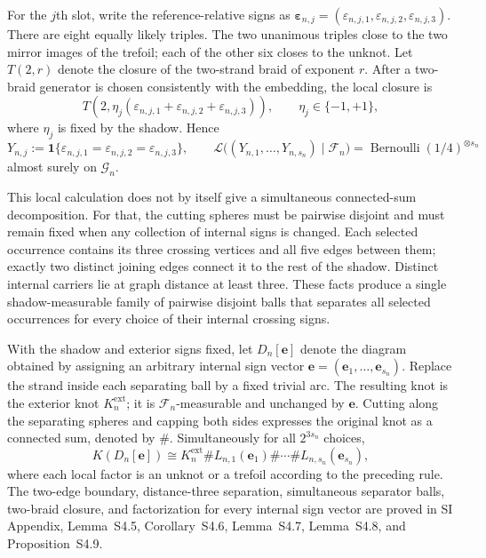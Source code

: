 \documentclass[9pt,twoside]{pnas-new}
\theoremstyle{definition}
\theoremstyle{remark}
\newcommand{\SILocation}[1]{SI Appendix, #1}
\newcommand{\SIGenuineInterface}{Lemma~S4.5}
\newcommand{\SIDistanceThreeBuffer}{Corollary~S4.6}
\newcommand{\SISimultaneousSeparators}{Lemma~S4.7}
\newcommand{\SITwoBraidClosure}{Lemma~S4.8}
\newcommand{\SIPersistentFactorization}{Proposition~S4.9}
\begin{document}
For the $j$th slot, write the reference-relative signs as $\boldsymbol\varepsilon_{n,j}=(\varepsilon_{n,j,1},\varepsilon_{n,j,2},\varepsilon_{n,j,3})$.  There are eight equally likely triples.  The two unanimous triples close to the two mirror images of the trefoil; each of the other six closes to the unknot.  Let $T(2,r)$ denote the closure of the two-strand braid of exponent $r$.  After a two-braid generator is chosen consistently with the embedding, the local closure is
\[
 T\!\left(2,\eta_j(\varepsilon_{n,j,1}+\varepsilon_{n,j,2}+\varepsilon_{n,j,3})\right),
 \qquad \eta_j\in\{-1,+1\},
\]
where $\eta_j$ is fixed by the shadow.  Hence
\[
 Y_{n,j}:=\mathbf 1\{\varepsilon_{n,j,1}=\varepsilon_{n,j,2}=\varepsilon_{n,j,3}\},
 \qquad
 \mathcal L\bigl((Y_{n,1},\ldots,Y_{n,s_n})\mid\mathcal F_n\bigr)
 =\operatorname{Bernoulli}(1/4)^{\otimes s_n}
\]
almost surely on $\mathcal G_n$.

This local calculation does not by itself give a simultaneous connected-sum decomposition.  For that, the cutting spheres must be pairwise disjoint and must remain fixed when any collection of internal signs is changed.  Each selected occurrence contains its three crossing vertices and all five edges between them; exactly two distinct joining edges connect it to the rest of the shadow. Distinct internal carriers lie at graph distance at least three. These facts produce a single shadow-measurable family of pairwise disjoint balls that separates all selected occurrences for every choice of their internal crossing signs.

With the shadow and exterior signs fixed, let $D_n[\mathbf e]$ denote the diagram obtained by assigning an arbitrary internal sign vector $\mathbf e=(\mathbf e_1,\ldots,\mathbf e_{s_n})$.  Replace the strand inside each separating ball by a fixed trivial arc.  The resulting knot is the exterior knot $K_n^{\mathrm{ext}}$; it is $\mathcal F_n$-measurable and unchanged by $\mathbf e$.  Cutting along the separating spheres and capping both sides expresses the original knot as a connected sum, denoted by $\#$.  Simultaneously for all $2^{3s_n}$ choices,
\begin{equation}
 K(D_n[\mathbf e])
 \cong K_n^{\mathrm{ext}}\#L_{n,1}(\mathbf e_1)\#\cdots\#L_{n,s_n}(\mathbf e_{s_n}),
 \label{eq:simultaneous-factorization}
\end{equation}
where each local factor is an unknot or a trefoil according to the preceding rule.  The two-edge boundary, distance-three separation, simultaneous separator balls, two-braid closure, and factorization for every internal sign vector are proved in \SILocation{\SIGenuineInterface{}, \SIDistanceThreeBuffer{}, \SISimultaneousSeparators{}, \SITwoBraidClosure{}, and \SIPersistentFactorization{}}.
\end{document}
